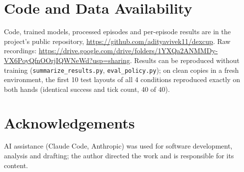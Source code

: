 \documentclass[10pt,twocolumn]{article}
\begin{document}
\section*{Code and Data Availability}
Code, trained models, processed episodes and per-episode results are in the project's public repository,
\url{https://github.com/adityavivek11/dexcup}. Raw recordings: \url{https://drive.google.com/drive/folders/1YXQa2ANMMDy-VX6PoyQfnOOrjIQWNeWd?usp=sharing}. Results can be reproduced without training
(\texttt{summarize\_results.py}, \texttt{eval\_policy.py}); on clean copies in a fresh environment, the first 10 test
layouts of all 4 conditions reproduced exactly on both hands (identical success and tick count, 40 of 40).

\section*{Acknowledgements}
AI assistance (Claude Code, Anthropic) was used for software development, analysis and drafting; the author directed the work and is responsible for its content.
\end{document}
